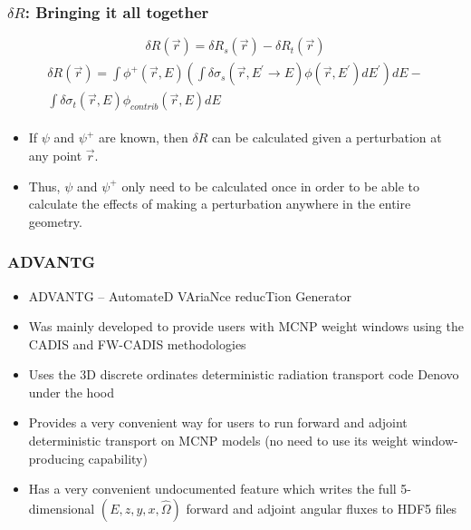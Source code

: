 \documentclass[t]{beamer}
\begin{document}
\begin{frame}
  \frametitle{$\delta R$: Bringing it all together}
  \begin{equation*}
    \delta R\left(\vec{r}\right) = \delta R_s\left(\vec{r}\right) - \delta R_t\left(\vec{r}\right)
  \end{equation*}
  \begin{multline}\boxed{\begin{gathered}
    \delta R\left(\vec{r}\right) = \int\phi^+\left(\vec{r},E\right)\left(\int\delta\sigma_s\left(\vec{r},E^\prime\rightarrow E\right)\phi\left(\vec{r},E^\prime\right)dE^\prime\right)dE - \\
    \int\delta\sigma_t\left(\vec{r},E\right)\phi_{contrib}\left(\vec{r},E\right)dE
  \end{gathered}}\end{multline}
  \begin{itemize}
    \item If $\psi$ and $\psi^+$ are known, then $\delta R$ can be calculated
          given a perturbation at any point $\vec{r}$.
    \item Thus, $\psi$ and $\psi^+$ only need to be calculated once in order to
          be able to calculate the effects of making a perturbation anywhere in
          the entire geometry.
  \end{itemize}
\end{frame}


\begin{frame}
  \frametitle{ADVANTG}
  \begin{itemize}
    \item ADVANTG -- AutomateD VAriaNce reducTion Generator
    \item Was mainly developed to provide users with MCNP weight windows using
          the CADIS and FW-CADIS methodologies
    \item Uses the 3D discrete ordinates deterministic radiation transport code
          Denovo under the hood
    \item Provides a very convenient way for users to run forward and adjoint
          deterministic transport on MCNP models (no need to use its weight
          window-producing capability)
    \item Has a very convenient undocumented feature which writes the full
          5-dimensional $(E,z,y,x,\hat{\Omega})$ forward and adjoint angular
          fluxes to HDF5 files
  \end{itemize}
\end{frame}
\end{document}
